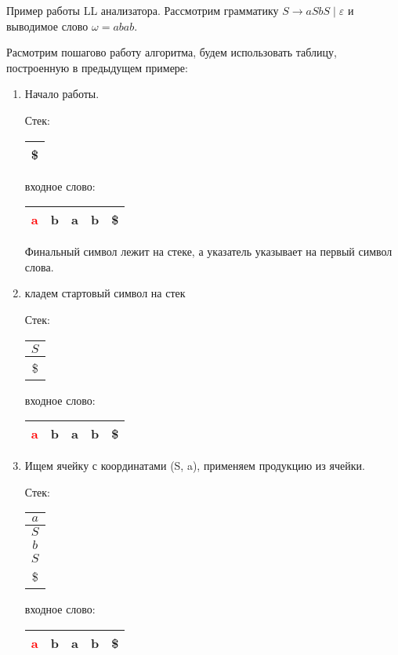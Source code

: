 \begin{example}Пример работы LL анализатора.
Рассмотрим грамматику $S \to aSbS \mid \varepsilon$ и выводимое слово $\omega = abab$.

Расмотрим пошагово работу алгоритма, будем использовать таблицу, построенную в предыдущем примере:

\begin{enumerate}
  \item Начало работы.

  Стек: \,
    \begin{tabular}[c]{ |c| }
        \\ \hline
        \$ \\ \hline
    \end{tabular}
    \qquad  \qquad \qquad  \qquad входное слово: \,
    \begin{tabular}[c]{ |c|c|c|c|c| }
        \hline
        \textcolor{red}{a} & b & a & b & \$ \\ \hline
    \end{tabular}

Финальный символ лежит на стеке, а указатель указывает на первый символ слова.

  \item кладем стартовый символ на стек

    Стек: \,
    \begin{tabular}[c]{ |c| }
        \\ \hline
        $S$ \\ \hline
        \$ \\ \hline
    \end{tabular}
    \qquad  \qquad \qquad  \qquad входное слово: \,
    \begin{tabular}[c]{ |c|c|c|c|c| }
        \hline
        \textcolor{red}{a} & b & a & b & \$ \\ \hline
    \end{tabular}

  \item Ищем ячейку с координатами (S, a), применяем продукцию из ячейки.

    Стек: \,
    \begin{tabular}[c]{ |c| }
        \\ \hline
        $a$ \\ \hline
        $S$ \\ \hline
        $b$ \\ \hline
        $S$ \\ \hline
        \$ \\ \hline
    \end{tabular}
    \qquad  \qquad \qquad  \qquad входное слово: \,
    \begin{tabular}[c]{ |c|c|c|c|c| }
        \hline
        \textcolor{red}{a} & b & a & b & \$ \\ \hline
    \end{tabular}


\end{enumerate}
\end{example}
